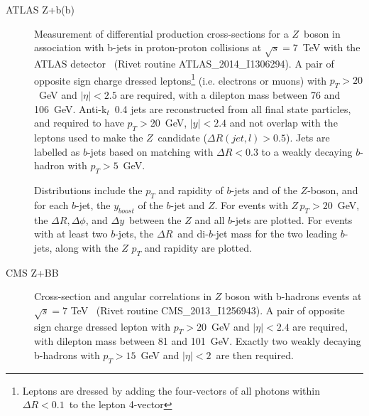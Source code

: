 \documentclass[11pt]{cernrep}
\newcommand{\pt}{\ensuremath{p_{T}}\xspace}
\begin{document}
\begin{description}
\item[ATLAS Z+b(b)] Measurement of differential production cross-sections for a $Z$\ boson
  in association with b-jets in proton-proton collisions at $\sqrt{s} =
  7$~TeV with the ATLAS detector~\cite{Aad:2014dvb} (Rivet routine
  ATLAS\_2014\_I1306294). A pair of opposite sign charge dressed
  leptons\footnote{Leptons are dressed by adding the four-vectors of all
    photons within $\Delta R<0.1$\ to the lepton 4-vector} (i.e. electrons or
  muons) with $\pt>20$~GeV and $|\eta|<2.5$ are required, with a dilepton
  mass between 76 and 106~GeV. Anti-k$_{t}$\ 0.4 jets are reconstructed from
  all final state particles, and required to have $\pt>$20~GeV, $|y|<2.4$ and
  not overlap with the leptons used to make the $Z$~candidate ($\Delta R(jet,
  l)> 0.5$). Jets are labelled as $b$-jets based on matching with $\Delta
  R<0.3$ to a weakly decaying $b$-hadron with $\pt>5$~GeV.

  Distributions include the \pt and rapidity of $b$-jets and of the
  $Z$-boson, and for each $b$-jet, the $y_{boost}$ of the $b$-jet and
  $Z$. For events with $Z\, \pt>20$~GeV, the $\Delta R, \Delta\phi$, and
  $\Delta y$\ between the $Z$ and all $b$-jets are plotted. For events with
  at least two $b$-jets, the $\Delta R$\ and di-$b$-jet mass for the two
  leading $b$-jets, along with the $Z$ \pt and rapidity are plotted.


\item[CMS Z+BB] Cross-section and angular correlations in $Z$ boson with b-hadrons
  events at $\sqrt{s} = 7$ TeV~\cite{Chatrchyan:2013zja} (Rivet routine
  CMS\_2013\_I1256943). A pair of opposite sign charge dressed lepton with
  $\pt>20$~GeV and $|\eta|<2.4$ are required, with dilepton mass between 81
  and 101~GeV. Exactly two weakly decaying b-hadrons with $\pt>15$~GeV and
  $|\eta|<2$\ are then required.


\end{description}
\end{document}
